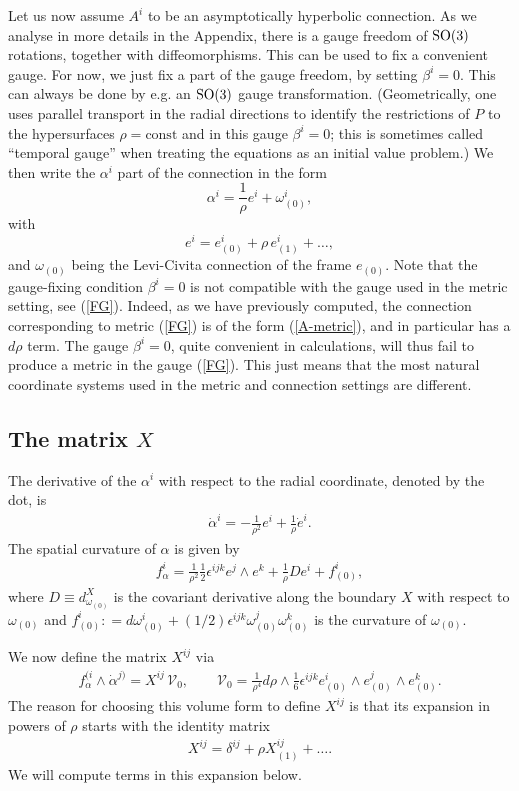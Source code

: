 \documentclass[a4paper,12pt]{article}
\newcommand{\be}{\begin{eqnarray}}
\newcommand{\ee}{\end{eqnarray}}
\begin{document}
Let us now assume $A^i$ to be an asymptotically hyperbolic connection. As we analyse in more details in the Appendix, there is a gauge freedom of ${\rm SO}(3)$ rotations, together with diffeomorphisms. This can be used to fix a convenient gauge. For now, we just fix a part of the gauge freedom, by setting $\beta^i=0$. This can always be done by e.g. an ${\rm SO}(3)$ gauge transformation. (Geometrically, one uses parallel transport in the radial directions to identify the restrictions of $P$ to the hypersurfaces $\rho = \text{const}$ and in this gauge $\beta^i=0$; this is sometimes called ``temporal gauge'' when treating the equations as an initial value problem.)  We then write the $\alpha^i$ part of the connection in the form 
$$\alpha^i=\frac{1}{\rho}e^i+\omega^i_{(0)},$$
with
$$ e^i = e^i_{(0)} + \rho \, e^i_{(1)} + \ldots,$$
and $\omega_{(0)}$ being the Levi-Civita connection of the frame $e_{(0)}$. Note that the gauge-fixing condition $\beta^i=0$ is not compatible with the gauge used in the metric setting, see (\ref{FG}). Indeed, as we have previously computed, the connection corresponding to metric (\ref{FG}) is of the form (\ref{A-metric}), and in particular has a $d\rho$ term. The gauge $\beta^i=0$, quite convenient in calculations, will thus fail to produce a metric in the gauge (\ref{FG}). This just means that the most natural coordinate systems used in the metric and connection settings are different.

\subsection{The matrix $X$}

The derivative of the $\alpha^i$ with respect to the radial coordinate, denoted by the dot, is 
\be
\dot{\alpha}^i = -\frac{1}{\rho^2} e^i + \frac{1}{\rho} \dot{e}^i.
\ee
The spatial curvature of $\alpha$ is given by
\be
f_\alpha^i=\frac{1}{\rho^2}\frac{1}{2}\epsilon^{ijk}e^j\wedge e^k+\frac{1}{\rho}D e^i+f^i_{(0)},
\ee
where $D\equiv d^X_{\omega_{(0)}}$ is the covariant derivative along the boundary $X$ with respect to $\omega_{(0)}$ and $f^i_{(0)}: = d\omega_{(0)}^i + (1/2)\epsilon^{ijk} \omega_{(0)}^j\omega_{(0)}^k$ is the curvature of $\omega_{(0)}$. 

We now define the matrix $X^{ij}$ via
\be\label{V0}
f_\alpha^{(i}\wedge \dot{\alpha}^{j)} = X^{ij}\, {\mathcal V}_0, \qquad {\mathcal V}_0 = \frac{1}{\rho^4} d\rho\wedge \frac{1}{6}\epsilon^{ijk} e^i_{(0)}\wedge e^j_{(0)}\wedge e^k_{(0)}.
\ee
The reason for choosing this volume form to define $X^{ij}$ is that its expansion in powers of $\rho$ starts with the identity matrix
\be\label{X-exp}
X^{ij} = \delta^{ij} + \rho X^{ij}_{(1)} +\ldots.
\ee
We will compute terms in this expansion below. 
\end{document}
